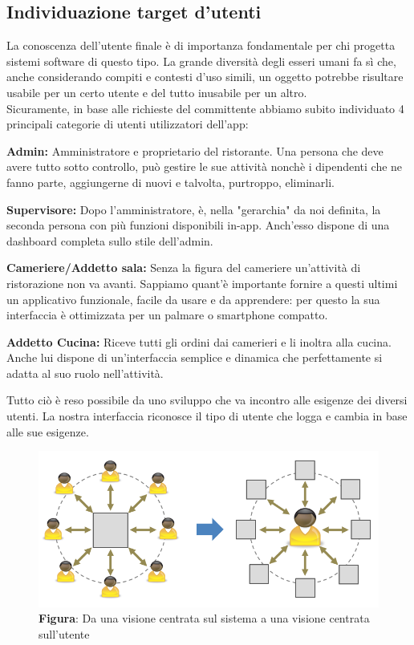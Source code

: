 \subsection{Individuazione target d'utenti}
    \begin{flushleft}
        La conoscenza dell'utente finale è di importanza fondamentale per chi progetta sistemi software di questo tipo. La grande diversità degli esseri umani
        fa sì che, anche considerando compiti e contesti d'uso simili, un oggetto potrebbe risultare usabile per un certo utente e
        del tutto inusabile per un altro.\\
        Sicuramente, in base alle richieste del committente abbiamo subito individuato 4 principali categorie di utenti utilizzatori dell'app:
        \vspace{0.5cm}
       
        \textbf{Admin:} Amministratore e proprietario del ristorante. Una persona che deve avere tutto sotto controllo, può gestire le sue attività nonchè i 
        dipendenti che ne fanno parte, aggiungerne di nuovi e talvolta, purtroppo, eliminarli.
        \vspace{1cm}

        \textbf{Supervisore:} Dopo l'amministratore, è, nella "gerarchia" da noi definita, la seconda persona con più funzioni disponibili in-app. 
        Anch'esso dispone di una dashboard completa sullo stile dell'admin.
        \vspace{1cm}

        \textbf{Cameriere/Addetto sala:} Senza la figura del cameriere un'attività di ristorazione non va avanti. Sappiamo quant'è importante fornire a questi ultimi
        un applicativo funzionale, facile da usare e da apprendere: per questo la sua interfaccia è ottimizzata per un palmare o smartphone compatto.
        \vspace{1cm}


        \textbf{Addetto Cucina:} Riceve tutti gli ordini dai camerieri e li inoltra alla cucina. Anche lui dispone di un'interfaccia semplice e dinamica che perfettamente si adatta al suo ruolo nell'attività.
        \vspace{0.5cm}        
        
        Tutto ciò è reso possibile da uno sviluppo che va incontro alle esigenze dei diversi utenti. La nostra interfaccia riconosce il tipo di utente che logga e cambia
        in base alle sue esigenze. 

    \end{flushleft}


    \begin{figure}[H]
        \centering
        \includegraphics[scale=0.5]{assets/immagini varie/target utenti.png}
        \caption*{\textbf{Figura}: Da una visione centrata sul sistema a una visione centrata sull’utente}\label{fig:target_utenti}
    \end{figure}